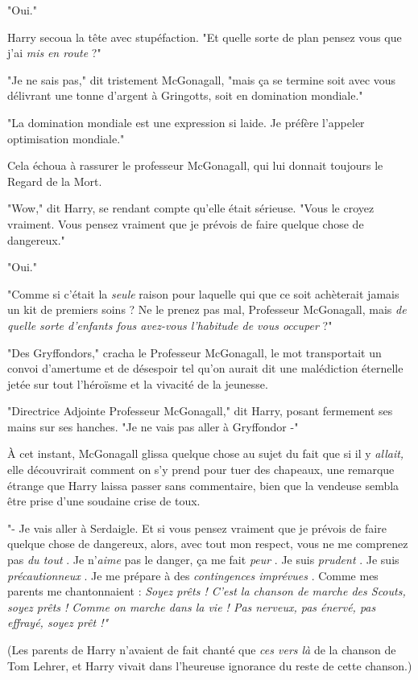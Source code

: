 "Oui."

Harry secoua la tête avec stupéfaction. "Et quelle sorte de plan pensez vous que j'ai \emph{mis}  \emph{en route}  ?"

"Je ne sais pas," dit tristement McGonagall, "mais ça se termine soit avec vous délivrant une tonne d'argent à Gringotts, soit en domination mondiale."

"La domination mondiale est une expression si laide. Je préfère l'appeler optimisation mondiale."

Cela échoua à rassurer le professeur McGonagall, qui lui donnait toujours le Regard de la Mort.

"Wow," dit Harry, se rendant compte qu'elle était sérieuse. "Vous le croyez vraiment. Vous pensez vraiment que je prévois de faire quelque chose de dangereux."

"Oui."

"Comme si c'était la \emph{seule}  raison pour laquelle qui que ce soit achèterait jamais un kit de premiers soins ? Ne le prenez pas mal, Professeur McGonagall, mais \emph{de quelle sorte d'enfants fous avez-vous l'habitude de vous occuper}  ?"

"Des Gryffondors," cracha le Professeur McGonagall, le mot transportait un convoi d'amertume et de désespoir tel qu'on aurait dit une malédiction éternelle jetée sur tout l'héroïsme et la vivacité de la jeunesse.

"Directrice Adjointe Professeur McGonagall," dit Harry, posant fermement ses mains sur ses hanches. "Je ne vais pas aller à Gryffondor -"

À cet instant, McGonagall glissa quelque chose au sujet du fait que si il y \emph{allait,}  elle découvrirait comment on s'y prend pour tuer des chapeaux, une remarque étrange que Harry laissa passer sans commentaire, bien que la vendeuse sembla être prise d'une soudaine crise de toux.

"- Je vais aller à Serdaigle. Et si vous pensez vraiment que je prévois de faire quelque chose de dangereux, alors, avec tout mon respect, vous ne me comprenez pas \emph{du tout} . Je n'\emph{aime}  pas le danger, ça me fait \emph{peur} . Je suis \emph{prudent} . Je suis \emph{précautionneux} . Je me prépare à des \emph{contingences imprévues} . Comme mes parents me chantonnaient : \emph{Soyez prêts ! C'est la chanson de marche des Scouts, soyez prêts ! Comme on marche dans la vie ! Pas nerveux, pas énervé, pas effrayé, soyez prêt !"} 

(Les parents de Harry n'avaient de fait chanté que \emph{ces vers là}  de la chanson de Tom Lehrer, et Harry vivait dans l'heureuse ignorance du reste de cette chanson.)

